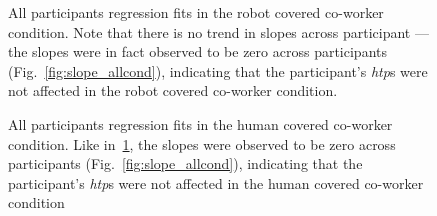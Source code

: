 \begin{figure}
	\caption{All participants regression fits in the robot covered co-worker condition. Note that there is no trend in slopes across participant ---the slopes were in fact observed to be zero across participants (Fig.~\ref{fig:slope_allcond}), indicating that the participant's {\it htp}s were not affected in the robot covered co-worker condition.}
\label{S3_Fig}
\end{figure}


\begin{figure}[hpt]
	\caption{All participants regression fits in the human covered co-worker condition. Like in~\ref{S3_Fig}, the slopes were observed to be zero across participants (Fig.~\ref{fig:slope_allcond}), indicating that  the participant's {\it htp}s were not affected in the human covered co-worker condition}
	\label{S4_Fig}
\end{figure}


